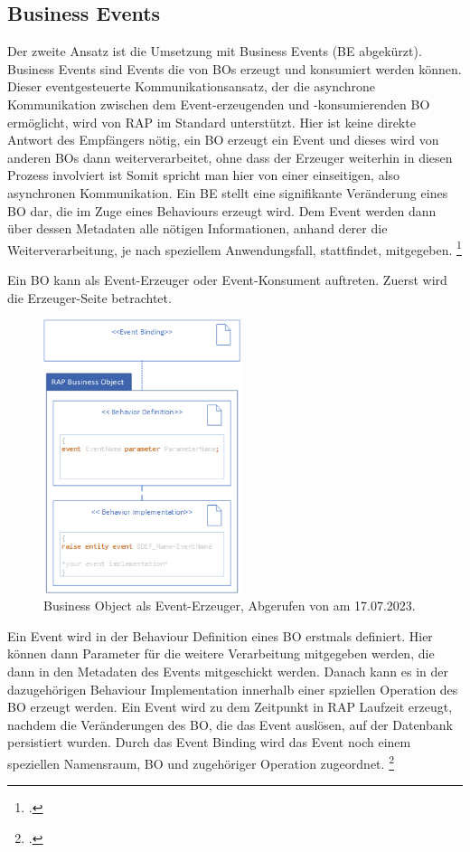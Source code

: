 \subsection{Business Events}

Der zweite Ansatz ist die Umsetzung mit Business Events (BE abgekürzt). Business Events sind Events die von BOs erzeugt und konsumiert werden können. Dieser eventgesteuerte Kommunikationsansatz, der die asynchrone Kommunikation zwischen dem Event-erzeugenden und -konsumierenden BO ermöglicht, wird von RAP im Standard unterstützt. Hier ist keine direkte Antwort des Empfängers nötig, ein BO erzeugt ein Event und dieses wird von anderen BOs dann weiterverarbeitet, ohne dass der Erzeuger weiterhin in diesen Prozess involviert ist Somit spricht man hier von einer einseitigen, also asynchronen Kommunikation. 
Ein BE stellt eine signifikante Veränderung eines BO dar, die im Zuge eines Behaviours erzeugt wird. Dem Event werden dann über dessen Metadaten alle nötigen Informationen, anhand derer die Weiterverarbeitung, je nach speziellem Anwendungsfall, stattfindet, mitgegeben. \footcite[Vgl.][]{sap_business-events_2023}

Ein BO kann als Event-Erzeuger oder Event-Konsument auftreten. Zuerst wird die Erzeuger-Seite betrachtet.

\begin{figure}[H]
    \centering
    \includegraphics[height=8cm]{Bilder/Business-Events_BO-as-event-consumer.png}
    \caption[Business Object als Event-Erzeuger]{Business Object als Event-Erzeuger, Abgerufen von \cite{sap_business-events_2023} am 17.07.2023.}
    \label{fig:iso_norm}
\end{figure}

Ein Event wird in der Behaviour Definition eines BO erstmals definiert. Hier können dann Parameter für die weitere Verarbeitung mitgegeben werden, die dann in den Metadaten des Events mitgeschickt werden. Danach kann es in der dazugehörigen Behaviour Implementation innerhalb einer spziellen Operation des BO erzeugt werden. Ein Event wird zu dem Zeitpunkt in RAP Laufzeit erzeugt, nachdem die Veränderungen des BO, die das Event auslösen, auf der Datenbank persistiert wurden. Durch das Event Binding wird das Event noch einem speziellen Namensraum, BO und zugehöriger Operation zugeordnet. \footcite[Vgl.][]{sap_business-events_2023}

